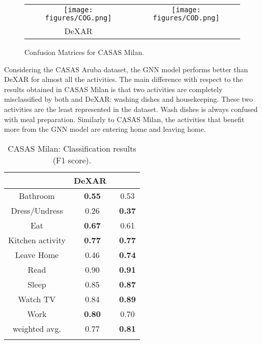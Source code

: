 \begin{figure*}
  \centering
  \begin{tabular}{c @{\qquad} c }
    \texttt{[image: figures/COG.png]} &
    \texttt{[image: figures/COD.png]} \\
    \small DeXAR & \small \acronym{}
  \end{tabular}
  \caption[Classification results on CASAS Milan]{Confusion Matrices for CASAS Milan.}
  \label{fig:cm_milan}
\end{figure*}



Considering the CASAS Aruba dataset, the GNN model performs better than DeXAR for almost all the activities. The main difference with respect to the results obtained in CASAS Milan is that two activities are completely misclassified by both \acronym{} and DeXAR: washing dishes and housekeeping. These two activities are the least represented in the dataset. Wash dishes is always confused with meal preparation. Similarly to CASAS Milan,  the activities that benefit more from the GNN model are entering home and leaving home.

\begin{table}
\begin{center}
\begin{tabular}{ccc}
\hline
& DeXAR~\cite{arrotta2022dexar} & \acronym{} \\
\hline
Bathroom & \textbf{0.55} & 0.53 \\
Dress/Undress & 0.26 & \textbf{0.37} \\
Eat & \textbf{0.67} & 0.61 \\
Kitchen activity & \textbf{0.77} & \textbf{0.77} \\
Leave Home & 0.46 & \textbf{0.74} \\
Read & 0.90 & \textbf{0.91} \\
Sleep & 0.85 & \textbf{0.87} \\
Watch TV & 0.84 & \textbf{0.89} \\
Work & \textbf{0.80} & 0.70 \\
\hline
weighted avg. & 0.77 & \textbf{0.81}\\
\hline
\hspace{5pt}
\end{tabular}
\caption{CASAS Milan: Classification results (F1 score).}
\label{tab:clf_milan}
\end{center}
\end{table}


